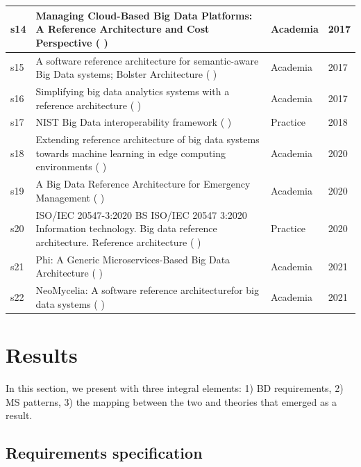 \documentclass{bmcart}
\begin{document}
\begin{table}
\begin{tabular}{|p{0.4cm}|p{9cm}|p{1.2cm}|p{0.5cm}|}
  \hline
  s14 & Managing Cloud-Based Big Data Platforms: A Reference Architecture and Cost Perspective (\cite{heilig2017managing} ) & Academia  &  2017   \\
  \hline
  s15 & A software reference architecture for semantic-aware Big Data systems; Bolster Architecture (\cite{Nadal} ) & Academia  &  2017   \\
  \hline
  s16 & Simplifying big data analytics systems with a reference architecture (\cite{sang2017simplifying} ) & Academia  &  2017   \\
  \hline
  s17 & NIST Big Data interoperability framework (\cite{Chang} ) & Practice  &  2018  \\
  \hline
  s18 & Extending reference architecture of big data systems towards machine learning in edge computing environments (\cite{paakkonen2020extending} )  & Academia & 2020   \\
  \hline
  s19 & A Big Data Reference Architecture for Emergency Management (\cite{iglesias2020big} )  & Academia & 2020   \\
  \hline
  s20 & ISO/IEC 20547-3:2020 BS ISO/IEC 20547 3:2020 Information technology. Big data reference architecture. Reference architecture (\cite{ISO20547} ) & Practice  &  2020  \\
  \hline
  s21 & Phi: A Generic Microservices-Based Big Data Architecture (\cite{maamouri2021phi} )  & Academia & 2021   \\
  \hline
  s22 & NeoMycelia: A software reference architecturefor big data systems (\cite{AtaeiApsec} )  & Academia & 2021   \\
  \hline
  \end{tabular}
\end{table}




\section{Results}

In this section, we present with three integral elements: 1) BD requirements, 2) MS patterns, 3) the mapping between the two and theories that emerged as a result.  

\subsection{Requirements specification} \label{requirementSpec}
\end{document}
